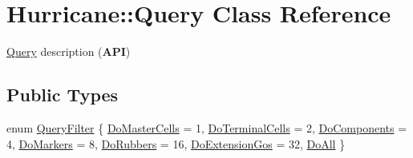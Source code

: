 \hypertarget{classHurricane_1_1Query}{}\section{Hurricane\+:\+:Query Class Reference}
\label{classHurricane_1_1Query}


\mbox{\hyperlink{classHurricane_1_1Query}{Query}} description ({\bfseries A\+PI})  


\subsection*{Public Types}
\begin{DoxyCompactItemize}
\item 
enum \mbox{\hyperlink{classHurricane_1_1Query_a003517b82eaba58104d1749cf344eaa9}{Query\+Filter}} \{ \newline
\mbox{\hyperlink{classHurricane_1_1Query_a003517b82eaba58104d1749cf344eaa9a427b951cfef3fbeb3c2baa9abc4eae83}{Do\+Master\+Cells}} = 1, 
\newline
\mbox{\hyperlink{classHurricane_1_1Query_a003517b82eaba58104d1749cf344eaa9a2a1f9d4cf126b86694e05152a1b04ee9}{Do\+Terminal\+Cells}} = 2, 
\newline
\mbox{\hyperlink{classHurricane_1_1Query_a003517b82eaba58104d1749cf344eaa9a7b591d72b86f94f90d212746ed8f9f56}{Do\+Components}} = 4, 
\newline
\mbox{\hyperlink{classHurricane_1_1Query_a003517b82eaba58104d1749cf344eaa9ade01b12e4a2af3bfba0440caa557619a}{Do\+Markers}} = 8, 
\newline
\mbox{\hyperlink{classHurricane_1_1Query_a003517b82eaba58104d1749cf344eaa9a3671f7b32f05ccbd1db6e6e94da040e4}{Do\+Rubbers}} = 16, 
\newline
\mbox{\hyperlink{classHurricane_1_1Query_a003517b82eaba58104d1749cf344eaa9a241d98f4f53e908f113669540ef4288c}{Do\+Extension\+Gos}} = 32, 
\newline
\mbox{\hyperlink{classHurricane_1_1Query_a003517b82eaba58104d1749cf344eaa9ad3d1832e33bbdd8fa1e07ce622c984ec}{Do\+All}}
 \}
\end{DoxyCompactItemize}
